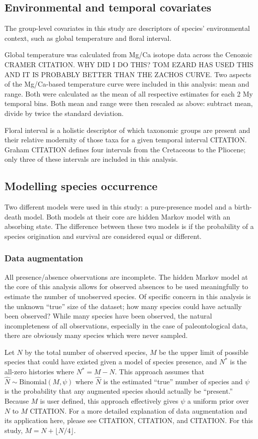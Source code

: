 \documentclass[12pt,letterpaper]{article}
\begin{document}
\subsection*{Environmental and temporal covariates}
The group-level covariates in this study are descriptors of species' environmental context, such as global temperature and floral interval. 

Global temperature was calculated from Mg/Ca isotope data across the Cenozoic CRAMER CITATION. \uppercase{why did i do this? tom ezard has used this and it is probably better than the zachos curve.} Two aspects of the Mg/Ca-based temperature curve were included in this analysis: mean and range. Both were calculated as the mean of all respective estimates for each 2 My temporal bins. Both mean and range were then rescaled as above: subtract mean, divide by twice the standard deviation.

Floral interval is a holistic descriptor of which taxonomic groups are present and their relative modernity of those taxa for a given temporal interval CITATION. Graham CITATION defines four intervals from the Cretaceous to the Pliocene; only three of these intervals are included in this analysis.


\subsection*{Modelling species occurrence}
Two different models were used in this study: a pure-presence model and a birth-death model. Both models at their core are hidden Markov model with an absorbing state. The difference between these two models is if the probability of a species origination and survival are considered equal or different. 

\subsubsection*{Data augmentation}
All presence/absence observations are incomplete. The hidden Markov model at the core of this analysis allows for observed absences to be used meaningfully to estimate the number of unobserved species. Of specific concern in this analysis is the unknown ``true'' size of the dataset; how many species could have actually been observed? While many species have been observed, the natural incompleteness of all observations, especially in the case of paleontological data, there are obviously many species which were never sampled.

Let \(N\) by the total number of observed species, \(M\) be the upper limit of possible species that could have existed given a model of species presence, and \(N^{\ast}\) is the all-zero histories where \(N^{\ast} = M - N\). This approach assumes that \(\hat{N} \sim \text{Binomial}(M, \psi)\) where \(\hat{N}\) is the estimated ``true'' number of species and \(\psi\) is the probability that any augmented species should actually be ``present.'' Because \(M\) is user defined, this approach effectively gives \(\psi\) a uniform prior over \(N\) to \(M\) CITATION. For a more detailed explanation of data augmentation and its application here, please see CITATION, CITATION, and CITATION. For this study, \(M = N + \lfloor{N / 4\rfloor}\).
\end{document}
